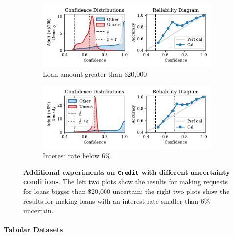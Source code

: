 \begin{figure}[t]
\centering

\begin{subfigure}[b]{0.495\textwidth}
  \centering
  \includegraphics[width=\linewidth]{figs/confidential_guardian/credit_res_loanamt.pdf}
  \caption{Loan amount greater than \$20,000}
\end{subfigure}
\hfill
\begin{subfigure}[b]{0.495\textwidth}
  \centering
  \includegraphics[width=\linewidth]{figs/confidential_guardian/credit_res_intrate.pdf}
  \caption{Interest rate below 6\%}
\end{subfigure}

\caption[\textbf{Additional experiments on \texttt{Credit} with different uncertainty conditions.}]{\textbf{Additional experiments on \texttt{Credit} with different uncertainty conditions}. The left two plots show the results for making requests for loans bigger than \$20,000 uncertain; the right two plots show the results for making loans with an interest rate smaller than 6\% uncertain.}
\label{fig:credit_ext}
\end{figure}


\paragraph{Tabular Datasets}

